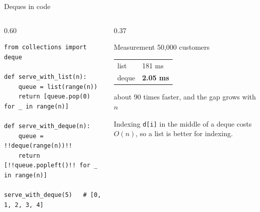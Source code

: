 \documentclass[aspectratio=169,11pt]{beamer}
\begin{document}
\begin{frame}[fragile]{Deques in code}
  \begin{columns}[T,onlytextwidth]
  \begin{column}{0.60\textwidth}
\begin{lstlisting}
from collections import deque

def serve_with_list(n):
    queue = list(range(n))
    return [queue.pop(0) for _ in range(n)]

def serve_with_deque(n):
    queue = !!deque(range(n))!!
    return [!!queue.popleft()!! for _ in range(n)]

serve_with_deque(5)   # [0, 1, 2, 3, 4]
\end{lstlisting}
  \end{column}
  \begin{column}{0.37\textwidth}
    \begin{block}{Measurement}
      50,000 customers\par\smallskip
      \begin{tabular}{@{}ll@{}}
        list & 181 ms\\
        deque & \textbf{2.05 ms}\\
      \end{tabular}\par\smallskip
      about 90 times faster, and the gap grows with $n$
    \end{block}
    \begin{block}{Indexing}
      \texttt{d[i]} in the middle of a deque costs $O(n)$, so a list is better for indexing.
    \end{block}
  \end{column}
  \end{columns}
\end{frame}
\end{document}
